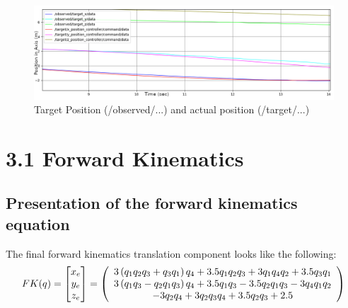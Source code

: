 \documentclass[11pt]{report}
\let\cos\relax
\let\sin\relax
\newcommand{\sin}[1]{\mathit{S}_{#1}}
\newcommand{\cos}[1]{\mathit{C}_{#1}}
\begin{document}
\begin{figure}[H]
    \includegraphics[width=\linewidth]{target.png}
    \caption{Target Position (/observed/...) and actual position (/target/...)}
\end{figure}


\section*{3.1 Forward Kinematics}
\subsection*{Presentation of the forward kinematics equation}

The final forward kinematics translation component looks like the following:\\


\begin{equation*}
FK(q) = 
\begin{bmatrix}
           x_{e} \\
           y_{e} \\
           z_{e}
\end{bmatrix} = 
\left(\begin{array}{c} %
    3 \left(\sin{q_{1}} \sin{q_{2}} \cos{q_{3}} + \sin{q_{3}} \cos{q_{1}}\right) \cos{q_{4}}  %
    + 3.5 \sin{q_{1}} \sin{q_{2}} \cos{q_{3}} %
    + 3 \sin{q_{1}} \sin{q_{4}} \cos{q_{2} } %
    + 3.5 \sin{q_{3}} \cos{q_{1}} %
    \\
    3 \left(\sin{q_{1}} \sin{q_{3}} %
    - \sin{q_{2}} \cos{q_{1}} \cos{q_{3}}\right) \cos{q_{4}} %
    + 3.5 \sin{q_{1}} \sin{q_{3}} %
    - 3.5 \sin{q_{2}} \cos{q_{1}} \cos{q_{3}} %
    - 3 \sin{q_{4}} \cos{q_{1}} \cos{q_{2}} %
    \\
    - 3 \sin{q_{2}} \sin{q_{4}} %
    + 3 \cos{q_{2}} \cos{q_{3}} \cos{q_{4}} %
    + 3.5 \cos{q_{2}} \cos{q_{3}} + 2.5
    \end{array}\right)
\end{equation*} \\
\end{document}
